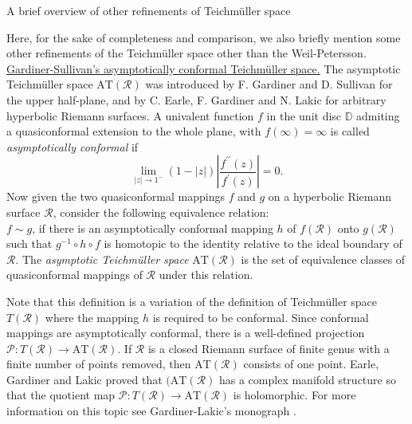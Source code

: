 \documentclass[12pt]{amsart}
\theoremstyle{plain}
\theoremstyle{definition}
\theoremstyle{remark}
\numberwithin{equation}{section} %
\numberwithin{figure}{section} %
\begin{document}
\begin{section}{A brief overview of other refinements of Teichm\"uller space}\label{birds eye view}

Here, for the sake of completeness and comparison, we also briefly mention some other refinements of the Teichm\"uller space other than the Weil-Petersson.\\

{\underline{Gardiner-Sullivan's asymptotically conformal Teichm\"uller space.}}
 The asymptotic Teichmüller space \(\mathrm{A T}(\mathscr{R})\)
was introduced by F. Gardiner and D. Sullivan \cite{Gardiner-Sullivan} for the upper half-plane, and by
C. Earle, F. Gardiner and N. Lakic \cite{EarleGardinerLakic1} for arbitrary hyperbolic Riemann surfaces. A univalent function \(f\) in the unit disc $\mathbb{D}$ admiting a quasiconformal extension to the whole plane, with \(f(\infty)=\infty\) is called {\it{asymptotically conformal}} \cite{Pommerenke}
  if $$
\lim_{|z| \rightarrow 1^{-}}(1-|z|)\left|\frac{f^{\prime \prime}(z)}{f^{\prime}(z)}\right|= 0. 
$$
  Now given the two quasiconformal mappings \(f\) and \(g\) on a hyperbolic Riemann surface $\mathscr{R}$, consider the following equivalence relation:\\
  $f\sim g$, if  there is an
asymptotically conformal mapping \(h\) of \(f(\mathscr{R})\) onto \(g(\mathscr{R})\) such that \(g^{-1} \circ h \circ f\)
is homotopic to the identity relative to the ideal boundary of \(\mathscr{R}\).
        The {\it {asymptotic
Teichmüller space}} \(\mathrm{A T}(\mathscr{R})\) is the set of equivalence classes of quasiconformal mappings of \(\mathscr{R}\) under this relation. 
       
Note that this definition is a variation of the definition of
Teichmüller space \({T}(\mathscr{R})\) where the mapping \(h\)
is required to be conformal.
Since conformal mappings are asymptotically conformal, there is a well-defined
projection $\mathcal{P}: T(\mathscr{R}) \rightarrow \mathrm{AT}(\mathscr{R})$. 
If $\mathscr{R}$ is a closed Riemann surface of finite genus with a finite number of points removed, then
$\mathrm{AT}(\mathscr{R})$ consists of one point.
Earle, Gardiner and Lakic \cite{EarleGardinerLakic1, EarleGardinerLakic2} proved that $(\mathrm{A T}(\mathscr{R})$ has a complex manifold
structure
so that the quotient map \(\mathcal{P}: T(\mathscr{R}) \rightarrow \mathrm{A T}(\mathscr{R})\) is holomorphic. For more information on this topic see Gardiner-Lakic's monograph \cite{GardinerLakic}. \\
     

\end{section}
\end{document}

